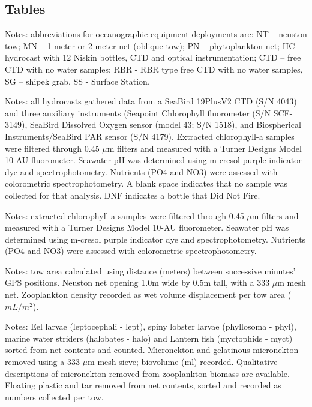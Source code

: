 \documentclass[letterpaper,11pt]{article}
\newcommand{\cruiseID}{S275}
\begin{document}
\clearpage
\begin{landscape}
\subsection*{Tables}

\fontsize{10}{12}\selectfont



\noindent Notes: abbreviations for oceanographic equipment deployments are: NT – neuston tow; MN – 1-meter or 2-meter net (oblique tow); PN – phytoplankton net; HC – hydrocast with 12 Niskin bottles, CTD and optical instrumentation; CTD – free CTD with no water samples; RBR - RBR type free CTD with no water samples, SG – shipek grab, SS - Surface Station.


\clearpage


\noindent Notes: all hydrocasts gathered data from a SeaBird 19PlusV2 CTD (S/N 4043) and three auxiliary instruments (Seapoint Chlorophyll fluorometer (S/N SCF-3149), SeaBird Dissolved Oxygen sensor (model 43; S/N 1518), and Biospherical Instruments/SeaBird PAR sensor (S/N 4179). Extracted chlorophyll-a samples were filtered through 0.45 $\mu$m filters and measured with a Turner Designs Model 10-AU fluorometer. Seawater pH was determined using m-cresol purple indicator dye and spectrophotometry. Nutrients (PO4 and NO3) were assessed with colorometric spectrophotometry. A blank space indicates that no sample was collected for that analysis. DNF indicates a bottle that Did Not Fire.

\clearpage


\clearpage

\noindent Notes: extracted chlorophyll-a samples were filtered through 0.45 $\mu$m filters and measured with a Turner Designs Model 10-AU fluorometer. Seawater pH was determined using m-cresol purple indicator dye and spectrophotometry. Nutrients (PO4 and NO3) were assessed with colorometric spectrophotometry.

\clearpage

\noindent Notes: tow area calculated using distance (meters) between successive minutes' GPS positions. Neuston net opening 1.0m wide by 0.5m tall, with a 333 $\mu$m mesh net. Zooplankton density recorded as wet volume displacement per tow area ($mL/m^2$).\\

\clearpage

\noindent Notes: Eel larvae (leptocephali - lept), spiny lobster larvae (phyllosoma - phyl), marine water striders (halobates - halo) and Lantern fish (myctophids - myct) sorted from net contents and counted. Micronekton and gelatinous micronekton removed using a 333 $\mu$m mesh sieve; biovolume (ml) recorded. Qualitative descriptions of micronekton removed from zooplankton biomass are available. Floating plastic and tar removed from net contents, sorted and recorded as numbers collected per tow.


\end{landscape}
\end{document}
